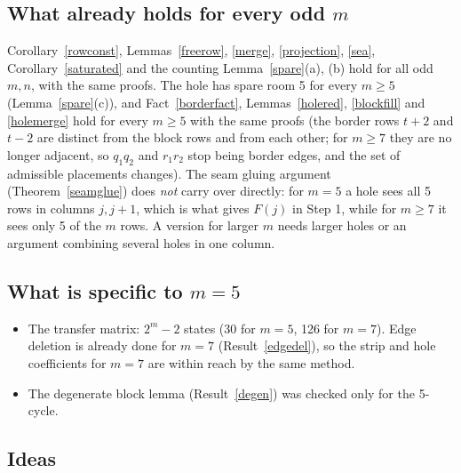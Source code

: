 \documentclass[11pt]{article}
\theoremstyle{plain}
\theoremstyle{definition}
\theoremstyle{remark}
\begin{document}
\subsection{What already holds for every odd $m$}

Corollary~\ref{rowconst}, Lemmas~\ref{freerow}, \ref{merge}, \ref{projection}, \ref{sea}, Corollary~\ref{saturated} and the
counting Lemma~\ref{spare}(a), (b) hold for all odd $m, n$, with the same proofs. The hole has spare room 5 for every $m \ge 5$
(Lemma~\ref{spare}(c)), and Fact~\ref{borderfact}, Lemmas~\ref{holered}, \ref{blockfill} and \ref{holemerge} hold for every
$m \ge 5$ with the same proofs (the border rows $t + 2$ and $t - 2$ are distinct from the block rows and from each other; for
$m \ge 7$ they are no longer adjacent, so $q_1 q_2$ and $r_1 r_2$ stop being border edges, and the set of admissible
placements changes). The seam gluing argument (Theorem~\ref{seamglue}) does \emph{not} carry over directly: for $m = 5$ a
hole sees all 5 rows in columns $j, j+1$, which is what gives $F(j)$ in Step 1, while for $m \ge 7$ it sees only 5 of the
$m$ rows. A version for larger $m$ needs larger holes or an argument combining several holes in one column.

\subsection{What is specific to $m = 5$}

\begin{itemize}[itemsep=0.2em]
\item The transfer matrix: $2^m - 2$ states (30 for $m = 5$, 126 for $m = 7$). Edge deletion is already done for $m = 7$
(Result~\ref{edgedel}), so the strip and hole coefficients for $m = 7$ are within reach by the same method.
\item The degenerate block lemma (Result~\ref{degen}) was checked only for the 5-cycle.
\end{itemize}

\subsection{Ideas}
\end{document}
